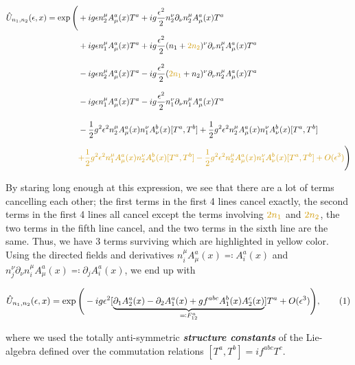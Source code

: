 \documentclass{article}
\newcommand\numberthis{\addtocounter{equation}{1}\tag{\theequation}}
\theoremstyle{plain} %
\theoremstyle{convention} %
\theoremstyle{remark} %
\def\df#1{\textbf{\textit{#1}}}
\numberwithin{equation}{section}
\begin{document}
\begin{align*}
    \hat{U}_{n_1,n_2}(\epsilon,x) = \exp \Bigg( &+ig \epsilon n_2^{\mu} A_{\mu}^a(x) T^a + ig \frac{\epsilon^2}{2} n_2^{\nu} \partial_{\nu} n_2^{\mu} A_{\mu}^a(x) T^a \Bigg. \\
    \Bigg. &+ig \epsilon n_1^{\mu} A_{\mu}^a(x) T^a + ig \frac{\epsilon^2}{2} (n_1+\textcolor{cyellow}{2 n_2})^{\nu} \partial_{\nu} n_1^{\mu} A_{\mu}^a(x) T^a \Bigg. \\
    \Bigg. &-ig \epsilon n_2^{\mu} A_{\mu}^a(x) T^a - ig \frac{\epsilon^2}{2} (\textcolor{cyellow}{2 n_1}+n_2)^{\nu} \partial_{\nu} n_2^{\mu} A_{\mu}^a(x) T^a \Bigg. \\
    \Bigg. &-ig \epsilon n_1^{\mu} A_{\mu}^a(x) T^a - ig \frac{\epsilon^2}{2} n_1^{\nu} \partial_{\nu} n_1^{\mu} A_{\mu}^a(x) T^a \Bigg. \\
    \Bigg. &-\frac{1}{2} g^2 \epsilon^2 n_2^{\mu} A_{\mu}^a(x) n_1^{\nu} A_{\nu}^b(x) [T^a,T^b] +\frac{1}{2} g^2 \epsilon^2 n_2^{\mu} A_{\mu}^a(x) n_1^{\nu} A_{\nu}^b(x) [T^a,T^b] \Bigg. \\
    \Bigg. &\textcolor{cyellow}{+\frac{1}{2} g^2 \epsilon^2 n_1^{\mu} A_{\mu}^a(x) n_2^{\nu} A_{\nu}^b(x) [T^a,T^b] -\frac{1}{2} g^2 \epsilon^2 n_2^{\mu} A_{\mu}^a(x) n_1^{\nu} A_{\nu}^b(x) [T^a,T^b] + O(\epsilon^3)} \Bigg)
\end{align*}

By staring long enough at this expression, we see that there are a lot of terms cancelling each other; the first terms in the first \num{4} lines cancel exactly, the second terms in the first \num{4} lines all cancel except the terms involving $\textcolor{cyellow}{2 n_1}$ and $\textcolor{cyellow}{2 n_2}$, the two terms in the fifth line cancel, and the two terms in the sixth line are the same. Thus, we have \num{3} terms surviving which are highlighted in \textcolor{cyellow}{yellow} color. Using the directed fields and derivatives $n_i^{\mu} A_{\mu}^a(x) \eqqcolon A_i^a(x)$ and $n_j^{\nu} \partial_{\nu} n_i^{\mu} A_{\mu}^a(x) \eqqcolon \partial_j A_i^a(x)$, we end up with

\begin{align*}
    \hat{U}_{n_1,n_2}(\epsilon,x) = \exp \Bigg( -ig \epsilon^2 [ \underbrace{\partial_1 A_2^a(x) - \partial_2 A_1^a(x) + g f^{abc} A_1^b(x) A_2^c(x)}_{\eqqcolon F_{12}^a} ] T^a + O(\epsilon^3) \Bigg), \numberthis \label{eq:plaq_exp}
\end{align*}

where we used the totally anti-symmetric \df{structure constants} of the Lie-algebra defined over the commutation relations $[T^a,T^b] = i f^{abc}T^c$.
\end{document}
